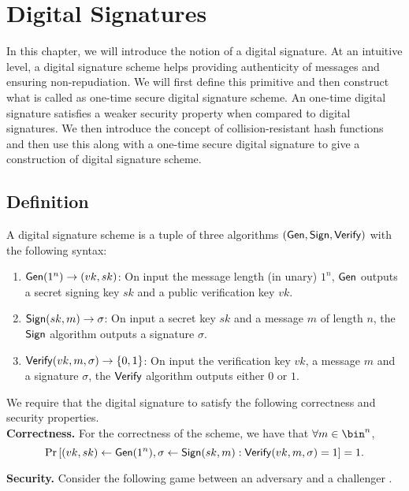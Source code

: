 
\chapter{Digital Signatures}

In this chapter, we will introduce the notion of a digital signature. At an intuitive level, a digital signature scheme helps providing authenticity of messages and ensuring non-repudiation. We will first define this primitive and then construct what is called as one-time secure digital signature scheme. An one-time digital signature satisfies a weaker security property when compared to digital signatures. We then introduce the concept of collision-resistant hash functions and then use this along with a one-time secure digital signature to give a construction of digital signature scheme.

\section{Definition}

A digital signature scheme is a tuple of three algorithms $(\mathsf{Gen},\mathsf{Sign},\mathsf{Verify})$ with the following syntax:
\begin{enumerate}
\item $\mathsf{Gen}(1^n)\to (vk,sk)$: On input the message length (in unary) $1^n$, $\mathsf{Gen}$ outputs a secret signing key $sk$ and a public verification key $vk$.
\item $\mathsf{Sign}(sk, m) \to \sigma$: On input a secret key $sk$ and a message $m$ of length $n$, the $\mathsf{Sign}$ algorithm outputs a signature $\sigma$.
\item $\mathsf{Verify}(vk, m, \sigma) \to \{0,1\}$: On input the verification key $vk$, a message $m$ and a signature $\sigma$, the $\mathsf{Verify}$ algorithm outputs either $0$ or $1$.
\end{enumerate}

We require that the digital signature to satisfy the following correctness and security properties.\\
\medskip
\noindent\textbf{Correctness.} For the correctness of the scheme, we have that
$\forall m \in \bin^n$,
\[\Pr \left[ (vk,sk) \gets \mathsf{Gen}(1^n), \sigma \leftarrow \mathsf{Sign}(sk,m) : \mathsf{Verify}(vk, m, \sigma) = 1 \right] = 1.\]

\medskip
\noindent\textbf{Security.} Consider the following game between an adversary and a challenger
.

